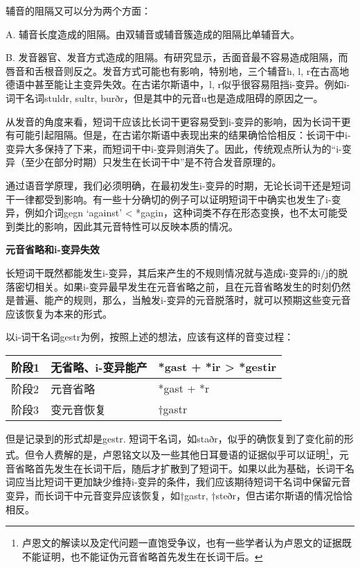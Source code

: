 辅音的阻隔又可以分为两个方面：

A. 辅音长度造成的阻隔。由双辅音或辅音簇造成的阻隔比单辅音大。

B.
发音器官、发音方式造成的阻隔。有研究显示，舌面音最不容易造成阻隔，而唇音和舌根音则反之。发音方式可能也有影响，特别地，三个辅音h,
l, r在古高地德语中甚至能让主变异失效。在古诺尔斯语中，l,
r似乎很容易阻挡i-变异。例如i-词干名词stuldr, sultr,
burðr，但是其中的元音u也是造成阻碍的原因之一。

从发音的角度来看，短词干应该比长词干更容易受到i-变异的影响，因为长词干更有可能引起阻隔。但是，在古诺尔斯语中表现出来的结果确恰恰相反：长词干中i-变异大多保持了下来，而短词干中i-变异则消失了。因此，传统观点所认为的``i-变异（至少在部分时期）只发生在长词干中''是不符合发音原理的。

通过语音学原理，我们必须明确，在最初发生i-变异的时期，无论长词干还是短词干一律都受到影响。有一些十分确切的例子可以证明短词干中确实也发生了i-变异，例如介词gegn
`against‌' \textless{}
*gagin，这种词类不存在形态变换，也不太可能受到类比的影响，因此其元音特性可以反映本质的情况。

\textbf{元音省略和i-变异失效}

长短词干既然都能发生i-变异，其后来产生的不规则情况就与造成i-变异的i/j的脱落密切相关。如果i-变异最早发生在元音省略之前，且在元音省略发生的时刻仍然是普遍、能产的规则，那么，当触发i-变异的元音脱落时，就可以预期这些变元音应该恢复为本来的形式。

以i-词干名词gestr为例，按照上述的想法，应该有这样的音变过程：

\begin{longtable}{lll}
\toprule
阶段1 & 无省略、i-变异能产 & *gast + *ir \textgreater{} *gestir \\
\midrule
\endhead
\bottomrule
\endfoot
阶段2 & 元音省略 & *gast + *r \\
阶段3 & 变元音恢复 & †gastr \\
\end{longtable}

但是记录到的形式却是gestr.
短词干名词，如staðr，似乎的确恢复到了变化前的形式。但令人费解的是，卢恩铭文以及一些其他日耳曼语的证据似乎可以证明\footnote{卢恩文的解读以及定代问题一直饱受争议，也有一些学者认为卢恩文的证据既不能证明，也不能证伪元音省略首先发生在长词干后。}，元音省略首先发生在长词干后，随后才扩散到了短词干。如果以此为基础，长词干名词应当比短词干更加缺少维持i-变异的条件，我们应该期待短词干名词中保留元音变异，而长词干中元音变异应该恢复，如†gastr,
†steðr，但古诺尔斯语的情况恰恰相反。

